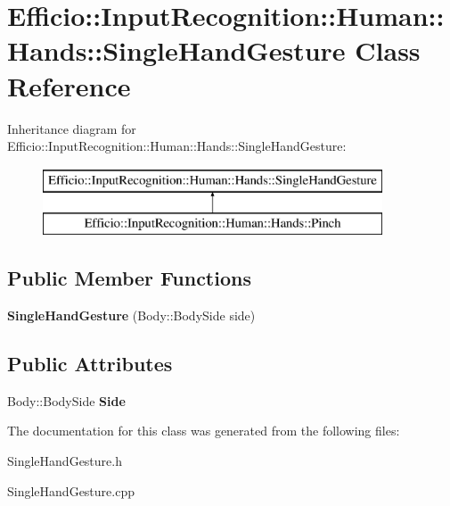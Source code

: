 \hypertarget{class_efficio_1_1_input_recognition_1_1_human_1_1_hands_1_1_single_hand_gesture}{}\section{Efficio\+:\+:Input\+Recognition\+:\+:Human\+:\+:Hands\+:\+:Single\+Hand\+Gesture Class Reference}
\label{class_efficio_1_1_input_recognition_1_1_human_1_1_hands_1_1_single_hand_gesture}
Inheritance diagram for Efficio\+:\+:Input\+Recognition\+:\+:Human\+:\+:Hands\+:\+:Single\+Hand\+Gesture\+:\begin{figure}[H]
\begin{center}
\leavevmode
\includegraphics[height=2.000000cm]{class_efficio_1_1_input_recognition_1_1_human_1_1_hands_1_1_single_hand_gesture}
\end{center}
\end{figure}
\subsection*{Public Member Functions}
\begin{DoxyCompactItemize}
\item 
{\bfseries Single\+Hand\+Gesture} (Body\+::\+Body\+Side side)\hypertarget{class_efficio_1_1_input_recognition_1_1_human_1_1_hands_1_1_single_hand_gesture_a63a8fc2546dc1a7e5962eb09de469f34}{}\label{class_efficio_1_1_input_recognition_1_1_human_1_1_hands_1_1_single_hand_gesture_a63a8fc2546dc1a7e5962eb09de469f34}

\end{DoxyCompactItemize}
\subsection*{Public Attributes}
\begin{DoxyCompactItemize}
\item 
Body\+::\+Body\+Side {\bfseries Side}\hypertarget{class_efficio_1_1_input_recognition_1_1_human_1_1_hands_1_1_single_hand_gesture_ad46d8585b784c4e9c4425e813fab2d5b}{}\label{class_efficio_1_1_input_recognition_1_1_human_1_1_hands_1_1_single_hand_gesture_ad46d8585b784c4e9c4425e813fab2d5b}

\end{DoxyCompactItemize}


The documentation for this class was generated from the following files\+:\begin{DoxyCompactItemize}
\item 
Single\+Hand\+Gesture.\+h\item 
Single\+Hand\+Gesture.\+cpp\end{DoxyCompactItemize}
